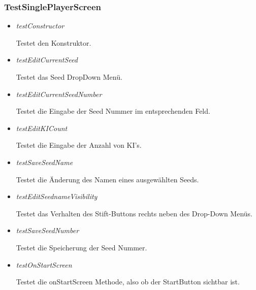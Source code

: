 \subsubsection{TestSinglePlayerScreen}
\begin{itemize}
    \item \textit{testConstructor}
        \begin{leftbar}[0.9\linewidth]
            Testet den Konstruktor.
        \end{leftbar}
    \item \textit{testEditCurrentSeed}
        \begin{leftbar}[0.9\linewidth]
            Testet das Seed DropDown Menü.
        \end{leftbar}
    \item \textit{testEditCurrentSeedNumber}
        \begin{leftbar}[0.9\linewidth]
            Testet die Eingabe der Seed Nummer im entsprechenden Feld.
        \end{leftbar}
    \item \textit{testEditKICount}
        \begin{leftbar}[0.9\linewidth]
            Testet die Eingabe der Anzahl von KI's.
        \end{leftbar}
    \pagebreak
    \item \textit{testSaveSeedName}
        \begin{leftbar}[0.9\linewidth]
            Testet die Änderung des Namen eines ausgewählten Seeds. 
        \end{leftbar}
    \item \textit{testEditSeednameVisibility}
        \begin{leftbar}[0.9\linewidth]
            Testet das Verhalten des Stift-Buttons rechts neben des Drop-Down Menüs.
        \end{leftbar}
    \item \textit{testSaveSeedNumber}
        \begin{leftbar}[0.9\linewidth]
            Testet die Speicherung der Seed Nummer.
        \end{leftbar}
    \item \textit{testOnStartScreen}
        \begin{leftbar}[0.9\linewidth]
            Testet die onStartScreen Methode, also ob der StartButton sichtbar ist.
        \end{leftbar}
\end{itemize}

